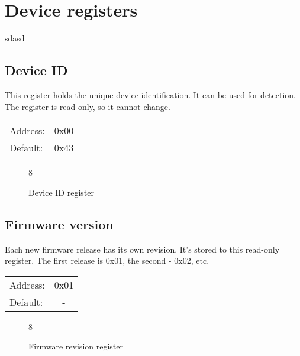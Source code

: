 \documentclass{article}
\begin{document}
	\section{Device registers}
	sdasd
	
	\subsection{Device ID}
	
		This register holds the unique device identification. It can be used for detection. The register is read-only, so it cannot change.
		
		\begin{tabular}{ l c }
			Address: & 0x00 \\
			Default: & 0x43 \\
		\end{tabular}
	
		\begin{figure}[H]
			\centering
			\begin{bytefield}[
				bitwidth=0.1\linewidth]{8}
				 \\
			\end{bytefield}
			\caption{Device ID register}
			\label{reg:device_id}
		\end{figure}
	
	\subsection{Firmware version}
	
		Each new firmware release has its own revision. It's stored to this read-only register.
		The first release is 0x01, the second - 0x02, etc.
		
		\begin{tabular}{ l c }
			Address: & 0x01 \\
			Default: & - \\
		\end{tabular}
		
		\begin{figure}[H]
			\centering
			\begin{bytefield}[
				bitwidth=0.1\linewidth]{8}
				\bitheader[endianness=big, bitformatting={\small\bfseries}]{0-7} \\
				\bitbox{8}{FW}
			\end{bytefield}
			\caption{Firmware revision register}
			\label{reg:fw_rev}
		\end{figure}
	
\end{document}
